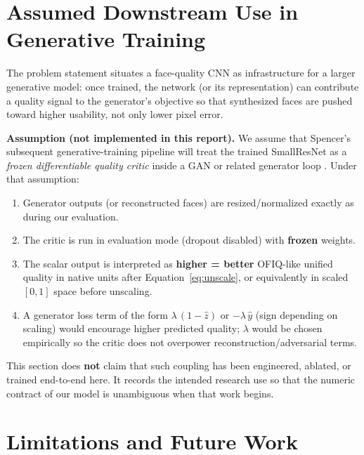 \documentclass[12pt, letterpaper, titlepage]{article}
\begin{document}
\FloatBarrier
\section{Assumed Downstream Use in Generative Training}
\label{sec:assumption}

The problem statement situates a face-quality CNN as infrastructure for a larger generative model: once trained, the network (or its representation) can contribute a quality signal to the generator's objective so that synthesized faces are pushed toward higher usability, not only lower pixel error.

\textbf{Assumption (not implemented in this report).} We assume that Spencer's subsequent generative-training pipeline will treat the trained SmallResNet as a \emph{frozen differentiable quality critic} inside a GAN or related generator loop \citep{goodfellow2014gan}. Under that assumption:
\begin{enumerate}[leftmargin=*]
    \item Generator outputs (or reconstructed faces) are resized/normalized exactly as during our evaluation.
    \item The critic is run in evaluation mode (dropout disabled) with \textbf{frozen} weights.
    \item The scalar output is interpreted as \textbf{higher = better} OFIQ-like unified quality in native units after Equation~\eqref{eq:unscale}, or equivalently in scaled $[0,1]$ space before unscaling.
    \item A generator loss term of the form $\lambda\,(1-\hat{z})$ or $-\lambda\,\hat{y}$ (sign depending on scaling) would encourage higher predicted quality; $\lambda$ would be chosen empirically so the critic does not overpower reconstruction/adversarial terms.
\end{enumerate}
This section does \textbf{not} claim that such coupling has been engineered, ablated, or trained end-to-end here. It records the intended research use so that the numeric contract of our model is unambiguous when that work begins.

\FloatBarrier
\section{Limitations and Future Work}
\label{sec:limits}
\end{document}

